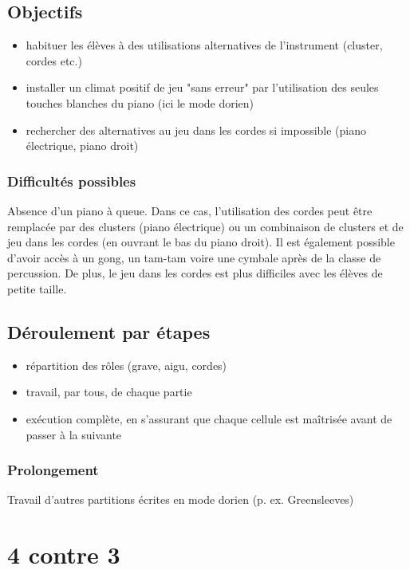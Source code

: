 \documentclass[a4paper,11pt,bibliography=totoc,numbers=noenddot,listof=flat,DIV=11,BCOR=0mm]{scrreprt}%
\begin{document}
\section*{Objectifs}
\begin{itemize}
\item habituer les élèves à des utilisations alternatives de l'instrument (cluster, cordes etc.)
\item installer un climat positif de jeu "sans erreur" par l'utilisation des seules touches blanches du piano (ici le mode dorien)
\item rechercher des alternatives au jeu dans les cordes si impossible (piano électrique, piano droit)
\end{itemize}

\subsection*{Difficultés possibles}
Absence d'un piano à queue. Dans ce cas, l'utilisation des cordes peut être remplacée par des clusters (piano électrique) ou un combinaison de clusters et de jeu dans les cordes (en ouvrant le bas du piano droit). Il est également possible d'avoir accès à un gong, un tam-tam voire une cymbale après de la classe de percussion. De plus, le jeu dans les cordes est plus difficiles avec les élèves de petite taille.

\section*{Déroulement par étapes}
\begin{itemize}
\item répartition des rôles (grave, aigu, cordes)
\item travail, par tous, de chaque partie
\item exécution complète, en s'assurant que chaque cellule est maîtrisée avant de passer à la suivante
\end{itemize}

\subsection*{Prolongement}
Travail d'autres partitions écrites en mode dorien (p. ex. Greensleeves)



\chapter[Cours complet: 4 contre 3]{4 contre 3}
\end{document}
